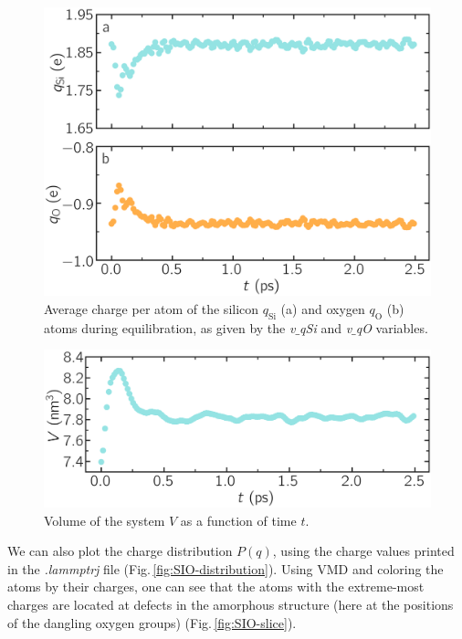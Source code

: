\documentclass[9pt,tutorial]{livecoms}
\begin{document}
\begin{figure}
\centering
\includegraphics[width=\linewidth]{SIO-charge}
\caption{Average charge per atom of the silicon $q_\text{Si}$ (a) and oxygen $q_\text{O}$ (b) atoms during equilibration, as given by the \textit{v$\_$qSi} and \textit{v$\_$qO} variables.}
\label{fig:SIO-charge}
\end{figure}

\begin{figure}
\includegraphics[width=\linewidth]{SIO-volume}
\caption{Volume of the system $V$ as a function of time $t$.}
\label{fig:SIO-volume}
\end{figure}

We can also plot the charge distribution $P(q)$, using the charge values printed in the \textit{.lammptrj} file (Fig.\,\ref{fig:SIO-distribution}). Using VMD and coloring the atoms by their charges, one can see that the atoms with the extreme-most charges are located at defects in the amorphous structure (here at the positions of the dangling oxygen groups) (Fig.\,\ref{fig:SIO-slice}).
\end{document}

